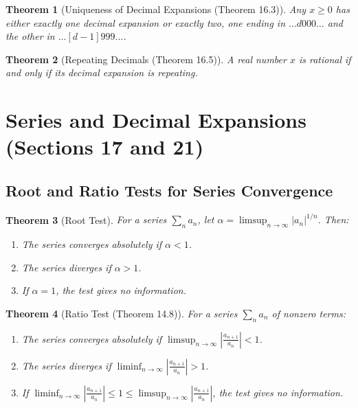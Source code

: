 \documentclass[9pt]{article}
\theoremstyle{definition}
\theoremstyle{plain}
\newtheorem{theorem}{Theorem}
\begin{document}
\begin{theorem}[Uniqueness of Decimal Expansions (Theorem 16.3)]
Any $ x \geq 0 $ has either exactly one decimal expansion or exactly two, one ending in $ \ldots d000\ldots $ and the other in $ \ldots [d-1]999\ldots $.
\end{theorem}

\begin{theorem}[Repeating Decimals (Theorem 16.5)]
A real number $ x $ is rational if and only if its decimal expansion is repeating.
\end{theorem}
\section*{Series and Decimal Expansions (Sections 17 and 21)}

\subsection*{Root and Ratio Tests for Series Convergence}
\begin{theorem}[Root Test]
For a series $ \sum_{n} a_n $, let $ \alpha = \limsup_{n \to \infty} |a_n|^{1/n} $. Then:
\begin{enumerate}
    \item The series converges absolutely if $ \alpha < 1 $.
    \item The series diverges if $ \alpha > 1 $.
    \item If $ \alpha = 1 $, the test gives no information.
\end{enumerate}
\end{theorem}

\begin{theorem}[Ratio Test (Theorem 14.8)]
For a series $ \sum_{n} a_n $ of nonzero terms:
\begin{enumerate}
    \item The series converges absolutely if $ \limsup_{n \to \infty} \left| \frac{a_{n+1}}{a_n} \right| < 1 $.
    \item The series diverges if $ \liminf_{n \to \infty} \left| \frac{a_{n+1}}{a_n} \right| > 1 $.
    \item If $ \liminf_{n \to \infty} \left| \frac{a_{n+1}}{a_n} \right| \leq 1 \leq \limsup_{n \to \infty} \left| \frac{a_{n+1}}{a_n} \right| $, the test gives no information.
\end{enumerate}
\end{theorem}
\end{document}
